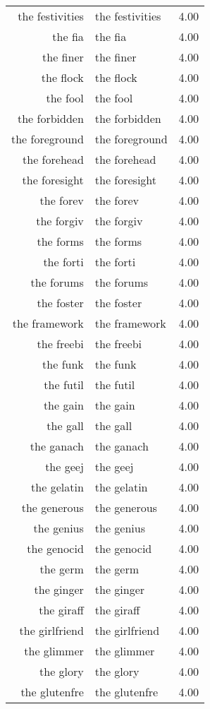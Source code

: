 \begin{table}[ht]
\begin{tabular}{rlr}
  the festivities & the festivities & 4.00 \\ 
  the fia & the fia & 4.00 \\ 
  the finer & the finer & 4.00 \\ 
  the flock & the flock & 4.00 \\ 
  the fool & the fool & 4.00 \\ 
  the forbidden & the forbidden & 4.00 \\ 
  the foreground & the foreground & 4.00 \\ 
  the forehead & the forehead & 4.00 \\ 
  the foresight & the foresight & 4.00 \\ 
  the forev & the forev & 4.00 \\ 
  the forgiv & the forgiv & 4.00 \\ 
  the forms & the forms & 4.00 \\ 
  the forti & the forti & 4.00 \\ 
  the forums & the forums & 4.00 \\ 
  the foster & the foster & 4.00 \\ 
  the framework & the framework & 4.00 \\ 
  the freebi & the freebi & 4.00 \\ 
  the funk & the funk & 4.00 \\ 
  the futil & the futil & 4.00 \\ 
  the gain & the gain & 4.00 \\ 
  the gall & the gall & 4.00 \\ 
  the ganach & the ganach & 4.00 \\ 
  the geej & the geej & 4.00 \\ 
  the gelatin & the gelatin & 4.00 \\ 
  the generous & the generous & 4.00 \\ 
  the genius & the genius & 4.00 \\ 
  the genocid & the genocid & 4.00 \\ 
  the germ & the germ & 4.00 \\ 
  the ginger & the ginger & 4.00 \\ 
  the giraff & the giraff & 4.00 \\ 
  the girlfriend & the girlfriend & 4.00 \\ 
  the glimmer & the glimmer & 4.00 \\ 
  the glory & the glory & 4.00 \\ 
  the glutenfre & the glutenfre & 4.00 \\ 

\end{tabular}
\end{table}

